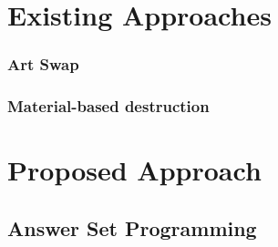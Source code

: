 \documentclass[t]{beamer}
\begin{document}
\section{Existing Approaches}
\subsubsection{Art Swap}
\subsubsection{Material-based destruction}




\section{Proposed Approach}
\subsection{Answer Set Programming}


\end{document}
